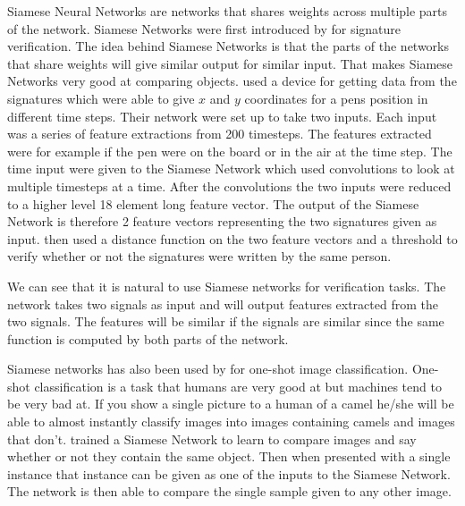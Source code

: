 Siamese Neural Networks are networks that shares weights across multiple parts
of the network. Siamese Networks were first introduced by \citet{NIPS1993_769}
for signature verification. The idea behind Siamese Networks is that the parts
of the networks that share weights will give similar output for similar input.
That makes Siamese Networks very good at comparing objects. \citet{NIPS1993_769}
used a device for getting data from the signatures which were able to give $x$
and $y$ coordinates for a pens position in different time steps. Their network
were set up to take two inputs. Each input was a series of feature extractions
from 200 timesteps. The features extracted were for example if the pen were
on the board or in the air at the time step. The time input were given to the
Siamese Network which used convolutions to look at multiple timesteps at a time.
After the convolutions the two inputs were reduced to a higher level 18 element
long feature vector. The output of the Siamese Network is therefore 2 feature
vectors representing the two signatures given as input. \citet{NIPS1993_769}
then used a distance function on the two feature vectors and a threshold to
verify whether or not the signatures were written by the same person.

We can see that it is natural to use Siamese networks for verification tasks.
The network takes two signals as input and will output features extracted from
the two signals. The features will be similar if the signals are similar since
the same function is computed by both parts of the network.

Siamese networks has also been used by \citet{Koch2015SiameseNN} for one-shot
image classification. One-shot classification is a task that humans are very
good at but machines tend to be very bad at. If you show a single picture to
a human of a camel he/she will be able to almost instantly classify images
into images containing camels and images that don't. \citet{Koch2015SiameseNN}
trained a Siamese Network to learn to compare images and say whether or not
they contain the same object. Then when presented with a single instance that
instance can be given as one of the inputs to the Siamese Network. The network
is then able to compare the single sample given to any other image.

